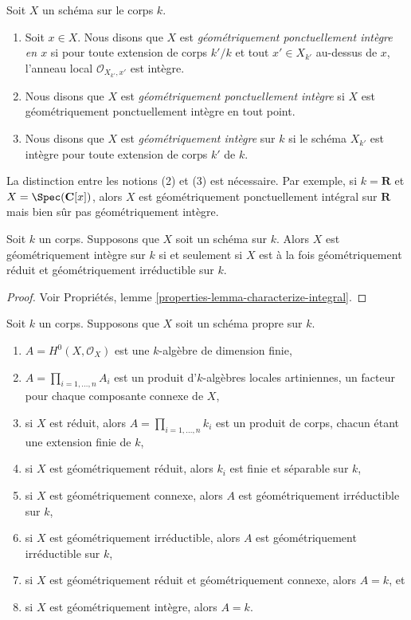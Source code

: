 \begin{definition}
\label{definition-geometrically-integral}
Soit $X$ un schéma sur le corps $k$.
\begin{enumerate}
\item Soit $x \in X$. Nous disons que $X$ est {\it
géométriquement ponctuellement intègre en $x$ } si pour toute
extension de corps $k'/k$ et tout $x' \in X_{k'}$ au-dessus de $x$,
l'anneau local $\mathcal{O}_{X_{k'}, x'}$ est intègre. \item Nous
disons que $X$ est {\it géométriquement ponctuellement intègre} si
$X$ est géométriquement ponctuellement intègre en tout point. \item
Nous disons que $X$ est {\it géométriquement intègre} sur $k$ si le
schéma $X_{k'}$ est intègre pour toute extension de corps $k'$ de $k$.
\end{enumerate}
\end{definition}

\noindent
La distinction entre les notions (2) et (3) est nécessaire.
Par exemple, si $k = \mathbf{R}$ et $X =
\Spec(\mathbf{C}[x])$, alors $X$ est géométriquement ponctuellement
intégral sur $\mathbf{R}$ mais bien sûr pas géométriquement intègre.

\begin{lemma}
\label{lemma-geometrically-integral}
Soit $k$ un corps. Supposons
que $X$ soit un schéma sur $k$. Alors $X$ est
géométriquement intègre sur $k$ si et
seulement si $X$ est à la fois géométriquement
réduit et géométriquement irréductible sur $k$.
\end{lemma}

\begin{proof}
Voir Propriétés, lemme \ref{properties-lemma-characterize-integral}.
\end{proof}

\begin{lemma}
\label{lemma-proper-geometrically-reduced-global-sections}
Soit $k$ un corps. Supposons que $X$ soit un schéma propre sur $k$.
\begin{enumerate}
\item $A = H^0(X, \mathcal{O}_X)$ est une $k$-algèbre
de dimension finie, \item $A = \prod_{i = 1, \ldots,
n} A_i$ est un produit d'$k$-algèbres locales
artiniennes, un facteur pour chaque composante connexe
de $X$, \item si $X$ est réduit, alors $A = \prod_{i =
1, \ldots, n} k_i$ est un produit de corps, chacun
étant une extension finie de $k$, \item si $X$ est
géométriquement réduit, alors $k_i$ est finie et séparable
sur $k$, \item si $X$ est géométriquement connexe, alors
$A$ est géométriquement irréductible sur $k$, \item si
$X$ est géométriquement irréductible, alors $A$ est
géométriquement irréductible sur $k$, \item si $X$ est
géométriquement réduit et géométriquement connexe, alors $A =
k$, et \item si $X$ est géométriquement intègre, alors $A = k$.
\end{enumerate}
\end{lemma}

